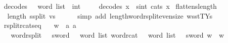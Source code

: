 \begin{isabellebody}
\isanewline
{}\isamarkupfalse%
\ decode{\isacharunderscore}{\kern0pt}s{}{}\ {\isacharcolon}{\kern0pt}{\isacharcolon}{\kern0pt}\ {\isachardoublequoteopen}{}\ word\ list\ {\isasymRightarrow}\ int{\isachardoublequoteclose}\isanewline
\ \ \isanewline
\ \ {\isachardoublequoteopen}decode{\isacharunderscore}{\kern0pt}s{}{}\ x\ {\isasymequiv}\ sint\ {\isacharparenleft}{\kern0pt}cat{\isacharunderscore}{\kern0pt}s{}{}\ x{\isacharparenright}{\kern0pt}{\isachardoublequoteclose}\isanewline
\isanewline
{}\isamarkupfalse%
\ flatten{\isacharunderscore}{\kern0pt}s{}{}{\isacharunderscore}{\kern0pt}length{\isacharcolon}{\kern0pt}\isanewline
\ \ {\isachardoublequoteopen}length\ {\isacharparenleft}{\kern0pt}s{}{}{\isacharunderscore}{\kern0pt}split\ vs{\isacharparenright}{\kern0pt}\ {\isacharequal}{\kern0pt}\ {}{\isachardoublequoteclose}\isanewline
%
\isadelimproof
\ \ %
\endisadelimproof
%
\isatagproof
{}\isamarkupfalse%
\ {\isacharparenleft}{\kern0pt}simp\ add{\isacharcolon}{\kern0pt}\ length{\isacharunderscore}{\kern0pt}word{\isacharunderscore}{\kern0pt}rsplit{\isacharunderscore}{\kern0pt}even{\isacharunderscore}{\kern0pt}size\ wsst{\isacharunderscore}{\kern0pt}TYs{\isacharparenleft}{\kern0pt}{}{\isacharparenright}{\kern0pt}{\isacharparenright}{\kern0pt}%
\endisatagproof
{\isafoldproof}%
%
\isadelimproof
\isanewline
%
\endisadelimproof
\isanewline
{}\isamarkupfalse%
\ rsplit{\isacharunderscore}{\kern0pt}rcat{\isacharunderscore}{\kern0pt}s{}{}{\isacharunderscore}{\kern0pt}eq{\isacharcolon}{\kern0pt}\isanewline
\ \ \ {\isachardoublequoteopen}w\ {\isacharequal}{\kern0pt}\ {\isacharbrackleft}{\kern0pt}a{}{\isacharcomma}{\kern0pt}\ a{}{\isacharbrackright}{\kern0pt}{\isachardoublequoteclose}\isanewline
\ \ \ {\isachardoublequoteopen}{\isacharparenleft}{\kern0pt}word{\isacharunderscore}{\kern0pt}rsplit\ {\isacharcolon}{\kern0pt}{\isacharcolon}{\kern0pt}\ {}{}\ sword\ {\isasymRightarrow}\ {}\ word\ list{\isacharparenright}{\kern0pt}\ {\isacharparenleft}{\kern0pt}{\isacharparenleft}{\kern0pt}word{\isacharunderscore}{\kern0pt}rcat\ {\isacharcolon}{\kern0pt}{\isacharcolon}{\kern0pt}\ {}\ word\ list\ {\isasymRightarrow}\ {}{}\ sword{\isacharparenright}{\kern0pt}\ w{\isacharparenright}{\kern0pt}\ {\isacharequal}{\kern0pt}\ w{\isachardoublequoteclose}\isanewline

\end{isabellebody}
